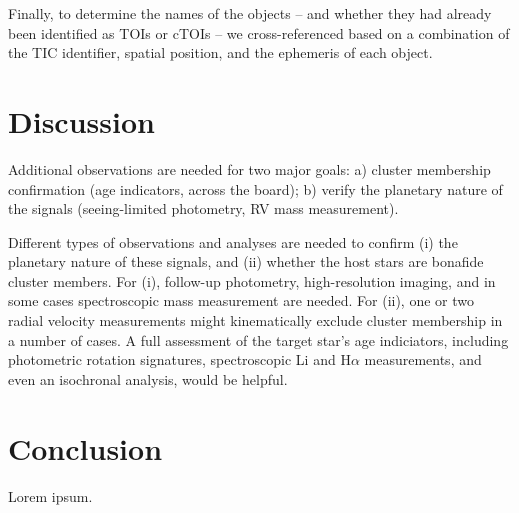 \documentclass[12pt,twocolumn,tighten]{aastex62}
\begin{document}
Finally, to determine the names of the objects -- and whether they
had already been identified as TOIs or cTOIs -- we cross-referenced
based on a combination of the TIC identifier, spatial position, and
the ephemeris of each object.



\section{Discussion}
\label{sec:discussion}

Additional observations are needed for two major goals:
a) cluster membership confirmation
(age indicators, across the board);
b) verify the planetary nature of the signals
(seeing-limited photometry, RV mass measurement).

Different types of observations and analyses are needed to confirm 
(i) the planetary nature of these signals, and
(ii) whether the host stars are bonafide cluster members.
For (i), follow-up photometry, high-resolution imaging, and in some
cases spectroscopic mass measurement are needed.
For (ii), one or two radial velocity measurements might kinematically
exclude cluster membership in a number of cases.
A full assessment of the target star's age indiciators, including
photometric rotation signatures, spectroscopic Li and H$\alpha$
measurements, and even an isochronal analysis, would be helpful.



\section{Conclusion}
\label{sec:conclusion}

Lorem ipsum.
\end{document}
